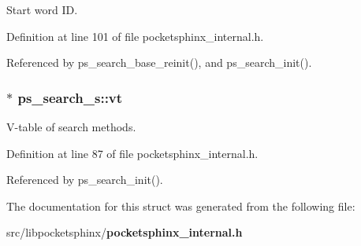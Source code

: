 Start word I\-D. 



Definition at line 101 of file pocketsphinx\-\_\-internal.\-h.



Referenced by ps\-\_\-search\-\_\-base\-\_\-reinit(), and ps\-\_\-search\-\_\-init().

\subsubsection[{vt}]{$\ast$ ps\-\_\-search\-\_\-s\-::vt}\label{structps__search__s_aa51e88956bbe9c05359d32526180809b}


V-\/table of search methods. 



Definition at line 87 of file pocketsphinx\-\_\-internal.\-h.



Referenced by ps\-\_\-search\-\_\-init().



The documentation for this struct was generated from the following file\-:\begin{DoxyCompactItemize}
\item 
src/libpocketsphinx/{\bf pocketsphinx\-\_\-internal.\-h}\end{DoxyCompactItemize}
